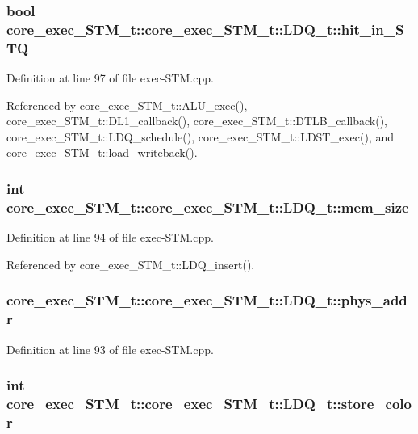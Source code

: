 \subsubsection[{hit\_\-in\_\-STQ}]{\setlength{\rightskip}{0pt plus 5cm}bool core\_\-exec\_\-STM\_\-t::core\_\-exec\_\-STM\_\-t::LDQ\_\-t::hit\_\-in\_\-STQ}\label{structcore__exec__STM__t_1_1LDQ__t_150852756a75072b2422a7a4f3872838}




Definition at line 97 of file exec-STM.cpp.

Referenced by core\_\-exec\_\-STM\_\-t::ALU\_\-exec(), core\_\-exec\_\-STM\_\-t::DL1\_\-callback(), core\_\-exec\_\-STM\_\-t::DTLB\_\-callback(), core\_\-exec\_\-STM\_\-t::LDQ\_\-schedule(), core\_\-exec\_\-STM\_\-t::LDST\_\-exec(), and core\_\-exec\_\-STM\_\-t::load\_\-writeback().
\subsubsection[{mem\_\-size}]{\setlength{\rightskip}{0pt plus 5cm}int core\_\-exec\_\-STM\_\-t::core\_\-exec\_\-STM\_\-t::LDQ\_\-t::mem\_\-size}\label{structcore__exec__STM__t_1_1LDQ__t_50cfceafd627c2cb461d0e9ed499b729}




Definition at line 94 of file exec-STM.cpp.

Referenced by core\_\-exec\_\-STM\_\-t::LDQ\_\-insert().
\subsubsection[{phys\_\-addr}]{ core\_\-exec\_\-STM\_\-t::core\_\-exec\_\-STM\_\-t::LDQ\_\-t::phys\_\-addr}\label{structcore__exec__STM__t_1_1LDQ__t_9a84f572d5a9d98cf3608b412078c0f2}




Definition at line 93 of file exec-STM.cpp.
\subsubsection[{store\_\-color}]{\setlength{\rightskip}{0pt plus 5cm}int core\_\-exec\_\-STM\_\-t::core\_\-exec\_\-STM\_\-t::LDQ\_\-t::store\_\-color}\label{structcore__exec__STM__t_1_1LDQ__t_73e6f5be270c15db5950d105b1bb2b28}




